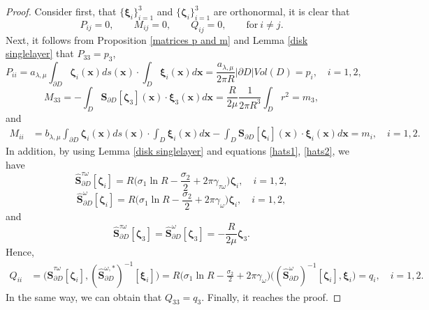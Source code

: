 \documentclass[10pt,reqno,oneside]{amsart}%
\theoremstyle{definition}
\theoremstyle{remark}
\numberwithin{equation}{section}
\numberwithin{equation}{section}
\begin{document}
\begin{proof}
Consider first, that $\{\boldsymbol{\xi}_i\}_{i=1}^{3}$ and $\{\boldsymbol{\zeta}_i\}_{i=1}^{3}$ are orthonormal, it is clear that
\begin{equation}
P_{ij}=0,\quad \quad M_{ij}=0, \quad \quad Q_{ij}=0, \quad\quad\text{for} \ i\neq j. \nonumber
\end{equation}
Next, it follows from Proposition \ref{matrices p and m} and Lemma \ref{disk singlelayer} that $P_{33}=p_3$,
$$
P_{ii}=a_{\lambda,\mu}\int_{ \partial D}\boldsymbol{\zeta}_i(\mathbf{x})ds(\mathbf{x})\cdot \int_{ D}\boldsymbol{\xi}_i(\mathbf{x})d\mathbf{x}
=\frac{{a}_{\lambda,\mu}}{2\pi R}|\partial D|Vol(D)=p_i,\quad i=1,2,
$$
$$
M_{33}=-\int_{ D} {\mathbf{S}}_{\partial D}[\boldsymbol{\zeta}_3](\mathbf{x}) \cdot \boldsymbol{\xi}_3(\mathbf{x}) d\mathbf{x}
=\frac{R}{2\mu}\frac{1}{2\pi R^3}\int_{D}r^2=m_3,
$$
and
\begin{align}
M_{ii}&={b}_{\lambda,\mu}\int_{ \partial D}\boldsymbol{\zeta}_i(\mathbf{x})ds(\mathbf{x}) \cdot\int_{ D}\boldsymbol{\xi}_i(\mathbf{x})d\mathbf{x}
-\int_{ D} {\mathbf{S}}_{\partial D}[\boldsymbol{\zeta}_i](\mathbf{x}) \cdot \boldsymbol{\xi}_i(\mathbf{x}) d\mathbf{x}=m_i,\quad i=1,2.\nonumber
\end{align}
In addition, by using Lemma \ref{disk singlelayer} and equations \eqref{hats1}, \eqref{hats2}, we have
$$
\hat{\mathbf{S}}_{\partial D}^{{\tau\omega} }[\boldsymbol{\zeta}_i]=R\Big(\sigma_{1}\ln{R}-\frac{\sigma_2}{2}+2\pi \gamma_{\tau\omega}\Big)\boldsymbol{\zeta}_i,\quad i=1,2,
$$
$$
\hat{\mathbf{S}}_{\partial D}^{{\omega} }[\boldsymbol{\zeta}_i]=R\Big(\sigma_{1}\ln{R}-\frac{\sigma_2}{2}+2\pi \gamma_{\omega}\Big)\boldsymbol{\zeta}_i,\quad i=1,2,
$$
and
$$
\hat{\mathbf{S}}_{\partial D}^{{\tau\omega} }[\boldsymbol{\zeta}_3]=\hat{\mathbf{S}}_{\partial D}^{{\omega} }[\boldsymbol{\zeta}_3]={-\frac{R}{2\mu}}\boldsymbol{\zeta}_3.
$$
Hence,
\begin{align}
Q_{ii}&=\Big(\hat{\mathbf{S}}_{\partial D}^{{\tau\omega} }[\boldsymbol{\zeta}_i],(\hat{\mathbf{S}}_{\partial D}^{{\omega},* })^{-1}[\boldsymbol{\xi}_i]\Big)=R\Big(\sigma_{1}\ln{R}-\frac{\sigma_2}{2}+2\pi \gamma_{\omega}\Big)\Big((\hat{\mathbf{S}}_{\partial D}^{{\omega}})^{-1}[\boldsymbol{\zeta}_i],\boldsymbol{\xi}_i\Big)=q_i,\quad i=1,2.\nonumber
\end{align}
In the same way, we can obtain that $Q_{33}=q_3$. Finally, it reaches the proof.
\end{proof}
\end{document}
